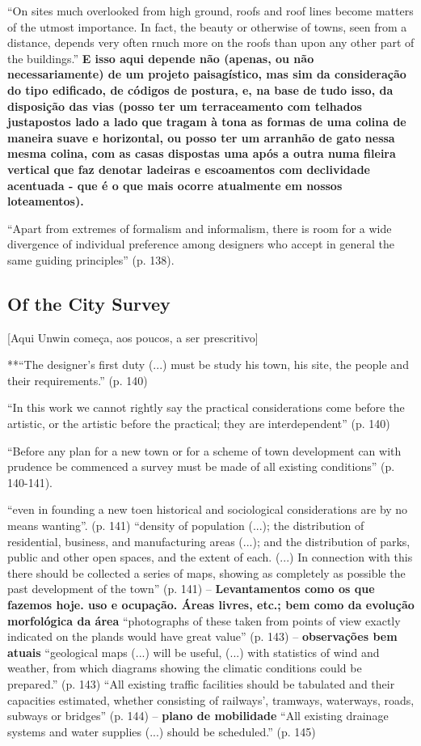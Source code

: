 \documentclass[12pt, a4paper]{book} %
\begin{document}
        ``On sites much overlooked from high ground, roofs and roof lines become matters of the utmost importance. In fact, the beauty or otherwise of towns, seen from a distance, depends very often rnuch more on the roofs than upon any other part of the buildings.'' \textbf{E isso aqui depende não (apenas, ou não necessariamente) de um projeto paisagístico, mas sim da consideração do tipo edificado, de códigos de postura, e, na base de tudo isso, da disposição das vias (posso ter um terraceamento com telhados justapostos lado a lado que tragam à tona as formas de uma colina de maneira suave e horizontal, ou posso ter um arranhão de gato nessa mesma colina, com as casas dispostas uma após a outra numa fileira vertical que faz denotar ladeiras e escoamentos com declividade acentuada - que é o que mais ocorre atualmente em nossos loteamentos).}

        ``Apart from extremes of formalism and informalism, there is room for a wide divergence of individual preference among designers who accept in general the same guiding principles'' (p. 138).

        \subsection*{Of the City Survey}

        [Aqui Unwin começa, aos poucos, a ser prescritivo]

        **``The designer's first duty (...) must be study his town, his site, the people and their requirements.'' (p. 140)

        ``In this work we cannot rightly say the practical considerations come before the artistic, or the artistic before the practical; they are interdependent'' (p. 140)

        ``Before any plan for a new town or for a scheme of town development can with prudence be commenced a survey must be made of all existing conditions'' (p. 140-141).

        ``even in founding a new toen historical and sociological considerations are by no means wanting''. (p. 141)
        ``density of population (...); the distribution of residential, business, and manufacturing areas (...); and the distribution of parks, public and other open spaces, and the extent of each. (...) In connection with this there should be collected a series of maps, showing as completely as possible the past development of the town'' (p. 141) – \textbf{Levantamentos como os que fazemos hoje. uso e ocupação. Áreas livres, etc.; bem como da evolução morfológica da área}
        ``photographs of these taken from points of view exactly indicated on the plands would have great value'' (p. 143) – \textbf{observações bem atuais}
        ``geological maps (...) will be useful, (...) with statistics of wind and weather, from which diagrams showing the climatic conditions could be prepared.'' (p. 143)
        ``All existing traffic facilities should be tabulated and their capacities estimated, whether consisting of railways', tramways, waterways, roads, subways or bridges'' (p. 144) – \textbf{plano de mobilidade}
        ``All existing drainage systems and water supplies (...) should be scheduled.'' (p. 145)
        
\end{document}
